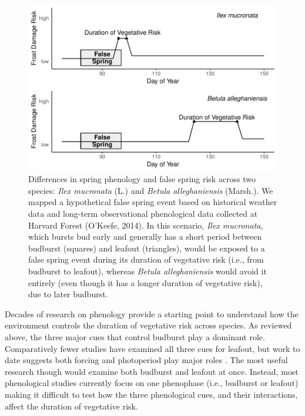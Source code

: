 \documentclass{article}\usepackage[]{graphicx}\usepackage[]{color}
\makeatletter
\def\maxwidth{ %
  \ifdim\Gin@nat@width>\linewidth
    \linewidth
  \else
    \Gin@nat@width
  \fi
}
\makeatother
\begin{document}
\begin{figure}[H]

{\centering \includegraphics[width=\maxwidth]{figure/risk-1} 

}

\caption{Differences in spring phenology and false spring risk across two species: \textit{Ilex mucronata} (L.) and \textit{Betula alleghaniensis} (Marsh.). We mapped a hypothetical false spring event based on historical weather data and long-term observational phenological data collected at Harvard Forest (O'Keefe, 2014). In this scenario, \textit{Ilex mucronata}, which bursts bud early and generally has a short period between budburst (squares) and leafout (triangles), would be exposed to a false spring event during its duration of vegetative risk (i.e., from budburst to leafout), whereas \textit{Betula alleghaniensis} would avoid it entirely (even though it has a longer duration of vegetative risk), due to later budburst.}\label{fig:risk}
\end{figure}



Decades of research on phenology provide a starting point to understand how the environment controls the duration of vegetative risk across species. As reviewed above, the three major cues that control budburst \citep[e.g., low winter temperatures, warm spring temperatures, and increasing photoperiods,][]
{Chuine2010} play a dominant role. Comparatively fewer studies have examined all three cues for leafout, but work to date suggests both forcing and photoperiod play major roles \citep{Basler2014, Flynn2018}. The most useful research though would examine both budburst and leafout at once. Instead, most phenological studies currently focus on one phenophase (i.e., budburst or leafout) making it difficult to test how the three phenological cues, and their interactions, affect the duration of vegetative risk.  
\end{document}
